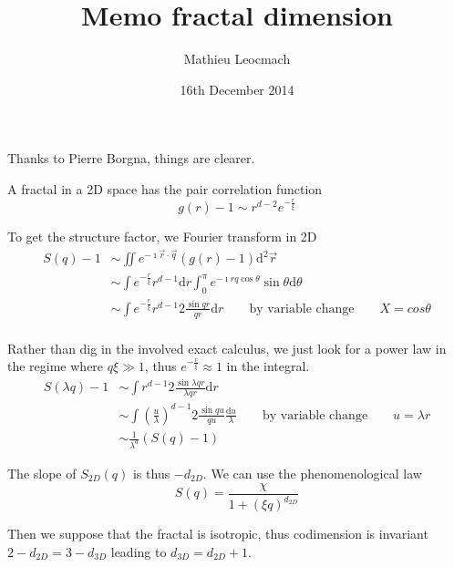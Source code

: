 \documentclass[12pt,a4paper]{article}
\author{Mathieu Leocmach}
\title{Memo fractal dimension}
\date{16th December 2014}
\begin{document}
\maketitle

Thanks to Pierre Borgna, things are clearer.

A fractal in a 2D space has the pair correlation function
\begin{equation}
g(r) -1 \sim r^{d-2} e^{-\frac{r}{\xi}}
\end{equation}

To get the structure factor, we Fourier transform in 2D
\begin{align*}
S(q) -1 &\sim \iint e^{-\imath \vec{r}\cdot\vec{q}} \left(g(r)-1\right) \mathrm{d}^2\vec{r}\\
&\sim \int e^{-\frac{r}{\xi}} r^{d-1} \mathrm{d}r
	\int_0^\pi e^{-\imath rq \cos \theta} \sin\theta \mathrm{d}\theta\\
&\sim \int e^{-\frac{r}{\xi}} r^{d-1} 2\frac{\sin qr}{qr}\mathrm{d}r
\qquad\text{by variable change}\qquad X=cos\theta\\
\end{align*}

Rather than dig in the involved exact calculus, we just look for a power law in the regime where $q\xi \gg 1$, thus $e^{-\frac{r}{\xi}} \approx 1$ in the integral.
\begin{align*}
S(\lambda q) -1 &\sim \int r^{d-1} 2\frac{\sin \lambda qr}{\lambda qr}\mathrm{d}r\\
&\sim \int \left(\frac{u}{\lambda}\right)^{d-1} 2\frac{\sin qu}{qu}\frac{\mathrm{d}u}{\lambda} \qquad\text{by variable change}\qquad u=\lambda r\\
&\sim \frac{1}{\lambda^d} \left(S(q) -1\right)
\end{align*}

The slope of $S_{2D}(q)$ is thus $-d_{2D}$. We can use the phenomenological law
\begin{equation}
S(q) = \frac{\chi}{1+(\xi q)^{d_{2D}}}
\end{equation}

Then we suppose that the fractal is isotropic, thus codimension is invariant $2-d_{2D} = 3-d_{3D}$ leading to $d_{3D} = d_{2D}+1$.
\end{document}
